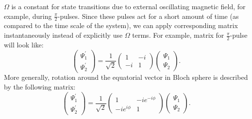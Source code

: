 \documentclass[12pt,notitlepage]{report}
\begin{document}
$\Omega$ is a constant for state transitions due to external oscillating magnetic field, for example, during $\frac{\pi}{2}$-pulses. Since these pulses act for a short amount of time (as compared to the time scale of the system), we can apply corresponding matrix instantaneously instead of explicitly use $\Omega$ terms. For example, matrix for $\frac{\pi}{2}$-pulse will look like:
\[
\begin{pmatrix}
	\Psi^\prime_1 \\	\Psi^\prime_2
\end{pmatrix} =
\frac{1}{\sqrt{2}} \begin{pmatrix}
	1 & -i \\ -i & 1
\end{pmatrix}
\begin{pmatrix}
	\Psi_1 \\ \Psi_2
\end{pmatrix}.
\]
More generally, rotation around the equatorial vector in Bloch sphere is described by the following matrix:
\[
\begin{pmatrix}
	\Psi^\prime_1 \\	\Psi^\prime_2
\end{pmatrix} =
\frac{1}{\sqrt{2}} \begin{pmatrix}
	1 & -i e^{-i \phi} \\ -i e^{i \phi} & 1
\end{pmatrix}
\begin{pmatrix}
	\Psi_1 \\ \Psi_2
\end{pmatrix}.
\]



\end{document}
